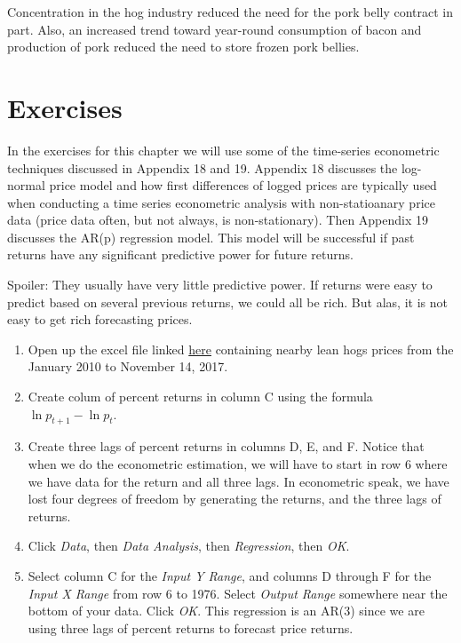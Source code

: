 \documentclass[
]{book}
\begin{document}
Concentration in the hog industry reduced the need for the pork belly contract in part. Also, an increased trend toward year-round consumption of bacon and production of pork reduced the need to store frozen pork bellies.

\hypertarget{exercises-8}{%
\section{Exercises}\label{exercises-8}}

In the exercises for this chapter we will use some of the time-series econometric techniques discussed in Appendix 18 and 19. Appendix 18 discusses the log-normal price model and how first differences of logged prices are typically used when conducting a time series econometric analysis with non-statioanary price data (price data often, but not always, is non-stationary). Then Appendix 19 discusses the AR(p) regression model. This model will be successful if past returns have any significant predictive power for future returns.

Spoiler: They usually have very little predictive power. If returns were easy to predict based on several previous returns, we could all be rich. But alas, it is not easy to get rich forecasting prices.

\begin{enumerate}
\def\labelenumi{\arabic{enumi}.}
\item
  Open up the excel file linked \href{Excel-files/LeanHogs.xlsx}{here} containing nearby lean hogs prices from the January 2010 to November 14, 2017.
\item
  Create colum of percent returns in column C using the formula \(\ln{p_{t+1}} - \ln{p_{t}}\).
\item
  Create three lags of percent returns in columns D, E, and F. Notice that when we do the econometric estimation, we will have to start in row 6 where we have data for the return and all three lags. In econometric speak, we have lost four degrees of freedom by generating the returns, and the three lags of returns.
\item
  Click \emph{Data}, then \emph{Data Analysis}, then \emph{Regression}, then \emph{OK}.
\item
  Select column C for the \emph{Input Y Range}, and columns D through F for the \emph{Input X Range} from row 6 to 1976. Select \emph{Output Range} somewhere near the bottom of your data. Click \emph{OK}. This regression is an AR(3) since we are using three lags of percent returns to forecast price returns.
\end{enumerate}
\end{document}
